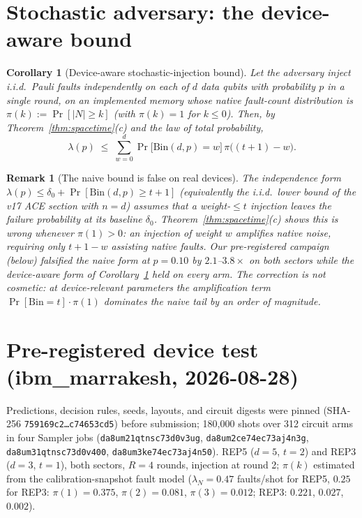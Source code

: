 \documentclass[10pt,twocolumn]{revtex4-2}
\newtheorem{corollary}{Corollary}
\newtheorem{remark}{Remark}
\begin{document}
\section{Stochastic adversary: the device-aware bound}

\begin{corollary}[Device-aware stochastic-injection bound]\label{cor:stoch}
Let the adversary inject i.i.d.\ Pauli faults independently on each of
$d$ data qubits with probability $p$ in a single round, on an
implemented memory whose native fault-count distribution is
$\pi(k):=\Pr[|N|\ge k]$ (with $\pi(k)=1$ for $k\le0$). Then, by
Theorem~\ref{thm:spacetime}(c) and the law of total probability,
\[
\lambda(p)\;\le\;\sum_{w=0}^{d}\Pr\bigl[\mathrm{Bin}(d,p)=w\bigr]\,
\pi\bigl((t{+}1)-w\bigr).
\]
\end{corollary}

\begin{remark}[The naive bound is false on real devices]\label{rem:naive}
The independence form
$\lambda(p)\le\delta_0+\Pr[\mathrm{Bin}(d,p)\ge t{+}1]$
(equivalently the i.i.d.\ lower bound of the v17 ACE section with
$n{=}d$) assumes that a weight-$\le t$ injection leaves the failure
probability at its baseline $\delta_0$. Theorem~\ref{thm:spacetime}(c)
shows this is wrong whenever $\pi(1)>0$: an injection of weight $w$
\emph{amplifies} native noise, requiring only $t{+}1{-}w$ assisting
native faults. Our pre-registered campaign (below) falsified the naive
form at $p=0.10$ by $2.1$--$3.8\times$ on both sectors while the
device-aware form of Corollary~\ref{cor:stoch} held on every arm.
The correction is not cosmetic: at device-relevant parameters the
amplification term $\Pr[\mathrm{Bin}=t]\cdot\pi(1)$ dominates the
naive tail by an order of magnitude.
\end{remark}

\section{Pre-registered device test (ibm\_marrakesh, 2026-08-28)}

Predictions, decision rules, seeds, layouts, and circuit digests were
pinned (SHA-256 \texttt{759169c2\dots c74653cd5}) before submission;
180{,}000 shots over 312 circuit arms in four Sampler jobs
(\texttt{da8um21qtnsc73d0v3ug}, \texttt{da8um2ce74ec73aj4n3g},
\texttt{da8um31qtnsc73d0v400}, \texttt{da8um3ke74ec73aj4n50}).
REP5 ($d{=}5$, $t{=}2$) and REP3 ($d{=}3$, $t{=}1$), both sectors,
$R{=}4$ rounds, injection at round 2; $\pi(k)$ estimated from the
calibration-snapshot fault model ($\lambda_N=0.47$ faults/shot for
REP5, $0.25$ for REP3: $\pi(1){=}0.375$, $\pi(2){=}0.081$,
$\pi(3){=}0.012$; REP3: $0.221$, $0.027$, $0.002$).
\end{document}
